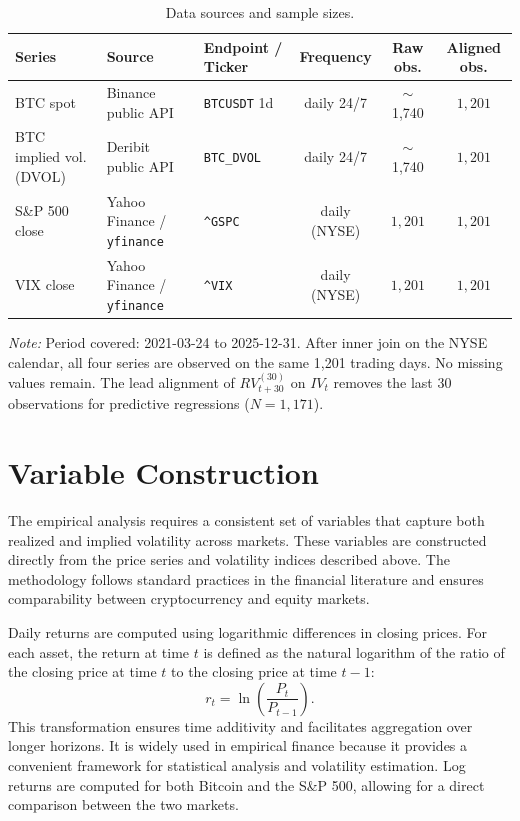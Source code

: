\documentclass[11pt,a4paper,openany]{report}
\begin{document}
\begin{table}[H]
\centering
\caption{Data sources and sample sizes.}
\label{tab:data_summary}
\small
\begin{tabular}{lllccc}
\toprule
Series & Source & Endpoint / Ticker & Frequency & Raw obs. & Aligned obs. \\
\midrule
BTC spot & Binance public API & \texttt{BTCUSDT} 1d & daily 24/7 & $\sim$1{,}740 & $1{,}201$ \\
BTC implied vol. (DVOL) & Deribit public API & \texttt{BTC\_DVOL} & daily 24/7 & $\sim$1{,}740 & $1{,}201$ \\
S\&P 500 close & Yahoo Finance / \texttt{yfinance} & \texttt{\^{}GSPC} & daily (NYSE) & $1{,}201$ & $1{,}201$ \\
VIX close & Yahoo Finance / \texttt{yfinance} & \texttt{\^{}VIX} & daily (NYSE) & $1{,}201$ & $1{,}201$ \\
\bottomrule
\end{tabular}
\begin{flushleft}\small
\textit{Note:} Period covered: 2021-03-24 to 2025-12-31. After inner join on the NYSE calendar, all four series are observed on the same 1{,}201 trading days. No missing values remain. The lead alignment of $RV^{(30)}_{t+30}$ on $IV_t$ removes the last 30 observations for predictive regressions ($N=1{,}171$).
\end{flushleft}
\end{table}

\section{Variable Construction}\label{variable-construction}

The empirical analysis requires a consistent set of variables that
capture both realized and implied volatility across markets. These
variables are constructed directly from the price series and volatility
indices described above. The methodology follows standard practices in
the financial literature and ensures comparability between
cryptocurrency and equity markets.

Daily returns are computed using logarithmic differences in closing
prices. For each asset, the return at time $t$ is defined as the natural
logarithm of the ratio of the closing price at time $t$ to the closing
price at time $t-1$:
\begin{equation}
r_t = \ln\!\left(\frac{P_t}{P_{t-1}}\right).
\label{eq:logret}
\end{equation}
This transformation ensures time additivity and
facilitates aggregation over longer horizons. It is widely used in
empirical finance because it provides a convenient framework for
statistical analysis and volatility estimation. Log returns are computed
for both Bitcoin and the S\&P 500, allowing for a direct comparison
between the two markets.
\end{document}
